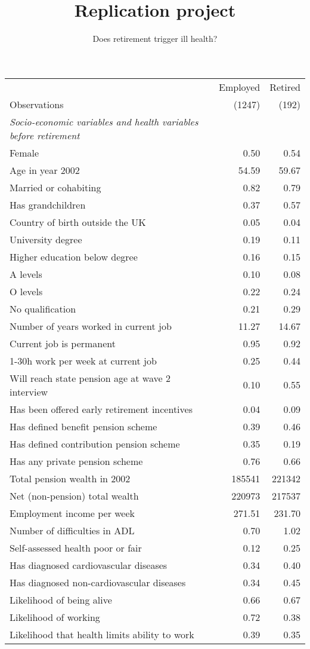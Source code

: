\documentclass[12pt]{article}
\title{\vspace{-8ex} Replication project \vspace{-2ex}}
\author{Does retirement trigger ill health?}
\date{\vspace{-4ex}}
\begin{document}
\maketitle

\begin{tabular}{lrr}
    \toprule
    & Employed & Retired \\
    Observations & (1247) & (192) \\
    \midrule
    \textit{Socio-economic variables and health variables before retirement} & & \\
    Female & 0.50 & 0.54 \\
    Age in year 2002 & 54.59 & 59.67 \\
    Married or cohabiting & 0.82 & 0.79 \\
    Has grandchildren & 0.37 & 0.57 \\
    Country of birth outside the UK & 0.05 & 0.04 \\
    University degree & 0.19 & 0.11 \\
    Higher education below degree & 0.16 & 0.15 \\
    A levels & 0.10 & 0.08 \\
    O levels & 0.22 & 0.24 \\
    No qualification & 0.21 & 0.29 \\
    Number of years worked in current job & 11.27 & 14.67 \\
    Current job is permanent & 0.95 & 0.92 \\
    1-30h work per week at current job & 0.25 & 0.44 \\
    Will reach state pension age at wave 2 interview & 0.10 & 0.55 \\
    Has been offered early retirement incentives & 0.04 & 0.09 \\
    Has defined benefit pension scheme & 0.39 & 0.46 \\
    Has defined contribution pension scheme & 0.35 & 0.19 \\
    Has any private pension scheme & 0.76 & 0.66 \\
    Total pension wealth in 2002 & 185541 & 221342 \\
    Net (non-pension) total wealth & 220973 & 217537 \\
    Employment income per week & 271.51 & 231.70 \\
    Number of difficulties in ADL & 0.70 & 1.02 \\
    Self-assessed health poor or fair & 0.12 & 0.25 \\
    Has diagnosed cardiovascular diseases & 0.34 & 0.40 \\
    Has diagnosed non-cardiovascular diseases & 0.34 & 0.45 \\
    Likelihood of being alive & 0.66 & 0.67 \\
    Likelihood of working & 0.72 & 0.38 \\
    Likelihood that health limits ability to work & 0.39 & 0.35 \\
    \bottomrule
\end{tabular}    
\end{document}
